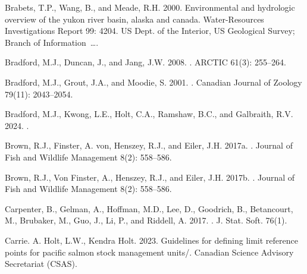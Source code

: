 \documentclass[11pt]{book}
\begin{document}
\begin{CSLReferences}{1}{0}
%
Brabets, T.P., Wang, B., and Meade, R.H. 2000. Environmental and hydrologic overview of the yukon river basin, alaska and canada. Water-Resources Investigations Report 99: 4204. US Dept. of the Interior, US Geological Survey; Branch of Information~\ldots.

%
Bradford, M.J., Duncan, J., and Jang, J.W. 2008. . ARCTIC 61(3): 255--264.

%
Bradford, M.J., Grout, J.A., and Moodie, S. 2001. . Canadian Journal of Zoology 79(11): 2043--2054.

%
Bradford, M.J., Kwong, L.E., Holt, C.A., Ramshaw, B.C., and Galbraith, R.V. 2024. .

%
Brown, R.J., Finster, A. von, Henszey, R.J., and Eiler, J.H. 2017a. . Journal of Fish and Wildlife Management 8(2): 558--586.

%
Brown, R.J., Von Finster, A., Henszey, R.J., and Eiler, J.H. 2017b. . Journal of Fish and Wildlife Management 8(2): 558--586.

%
Carpenter, B., Gelman, A., Hoffman, M.D., Lee, D., Goodrich, B., Betancourt, M., Brubaker, M., Guo, J., Li, P., and Riddell, A. 2017. . J. Stat. Soft. 76(1).

%
Carrie. A. Holt, L.W., Kendra Holt. 2023. Guidelines for defining limit reference points for pacific salmon stock management units/. Canadian Science Advisory Secretariat (CSAS).


\end{CSLReferences}
\end{document}
